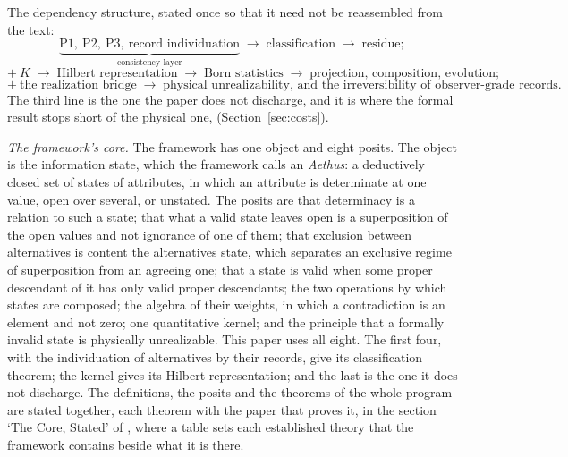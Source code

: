 \noindent The dependency structure, stated once so that it need not be reassembled from the text:
\[
\underbrace{\text{P1},\ \text{P2},\ \text{P3},\ \text{record individuation}}_{\text{consistency layer}} \;\longrightarrow\; \text{classification} \;\longrightarrow\; \text{residue};
\]
\[
+\ K \;\longrightarrow\; \text{Hilbert representation} \;\longrightarrow\; \text{Born statistics} \;\longrightarrow\; \text{projection, composition, evolution};
\]
\[
+\ \text{the realization bridge} \;\longrightarrow\; \text{physical unrealizability, and the irreversibility of observer-grade records.}
\]
The third line is the one the paper does not discharge, and it is where the formal result stops short of the physical one, (Section~\ref{sec:costs}).

\emph{The framework's core.} The framework has one object and eight posits. The object is the information state, which the framework calls an \emph{Aethus}: a deductively closed set of states of attributes, in which an attribute is determinate at one value, open over several, or unstated. The posits are that determinacy is a relation to such a state; that what a valid state leaves open is a superposition of the open values and not ignorance of one of them; that exclusion between alternatives is content the alternatives state, which separates an exclusive regime of superposition from an agreeing one; that a state is valid when some proper descendant of it has only valid proper descendants; the two operations by which states are composed; the algebra of their weights, in which a contradiction is an element and not zero; one quantitative kernel; and the principle that a formally invalid state is physically unrealizable. This paper uses all eight. The first four, with the individuation of alternatives by their records, give its classification theorem; the kernel gives its Hilbert representation; and the last is the one it does not discharge. The definitions, the posits and the theorems of the whole program are stated together, each theorem with the paper that proves it, in the section `The Core, Stated' of \cite{AethusBrief}, where a table sets each established theory that the framework contains beside what it is there.

